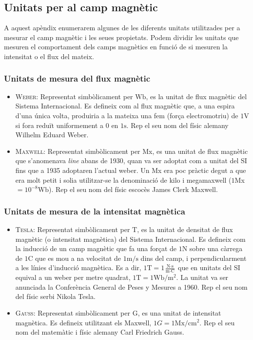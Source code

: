 \documentclass[11pt]{article}
\begin{document}
    \clearpage
    \subsection{Unitats per al camp magnètic}\label{appendix:unitats}
        \vspace{0.2cm}
        A aquest apèndix enumerarem algunes de les diferents unitats utilitzades per a mesurar el camp magnètic i les seues propietats. Podem dividir les unitats que mesuren el comportament dels camps magnètics en funció de si mesuren la intensitat o el flux del mateix.
        \subsubsection*{Unitats de mesura del flux magnètic}
            \begin{itemize}
                \item \textsc{Weber}: Representat simbòlicament per $\si{\weber}$, es la unitat de flux magnètic del Sistema Internacional. Es defineix com al flux magnètic que, a una espira d'una única volta, produiria a la mateixa una fem (força electromotriu) de $1\si{\volt}$ si fora reduït uniformement a 0 en $1\si{\second}$. Rep el seu nom del físic alemany Wilhelm Eduard Weber.
                
                \item \textsc{Maxwell}: Representat simbòlicament per Mx, es una unitat de flux magnètic que s'anomenava \textit{line} abans de 1930, quan va ser adoptat com a unitat del SI fins que a 1935 adoptaren l'actual weber. Un Mx era poc pràctic degut a que era molt petit i solia utilitzar-se la denominació de kilo i megamaxwell ($1$Mx $=10^{-8}\si{\weber}$). Rep el seu nom del físic escocès James Clerk Maxwell.
            \end{itemize}
        \subsubsection*{Unitats de mesura de la intensitat magnètica}
            \begin{itemize}
                \item \textsc{Tesla}: Representat simbòlicament per $\si{\tesla}$, es la unitat de densitat de flux magnètic (o intensitat magnètica) del Sistema Internacional. Es defineix com  la inducció de un camp magnètic que fa una forçat de $1\si{\newton}$ sobre una càrrega de $1\si{\coulomb}$ que es mou a na velocitat de $1\si{\meter}/\si{\second}$ dins del camp, i perpendicularment a les línies d'inducció magnètica. Es a dir, $1\si{\tesla}=1\frac{\si{\newton}\cdot\si{\second}}{\si{\meter}\cdot\si{\coulomb}}$ que en unitats del SI equival a un weber per metre quadrat, $1\si{\tesla}=1\si{\weber}/\si{\meter}^2$. La unitat va ser anunciada la Conferència General de Peses y Mesures a 1960. Rep el seu nom del físic serbi Nikola Tesla.
                \item \textsc{Gauss}: Representat simbòlicament per G, es una unitat de intensitat magnètica. Es defineix utilitzant els Maxwell, $1G = 1\text{Mx}/\si{\cm}^2$. Rep el seu nom del matemàtic i físic alemany Carl Friedrich Gauss.
            \end{itemize}
\end{document}
